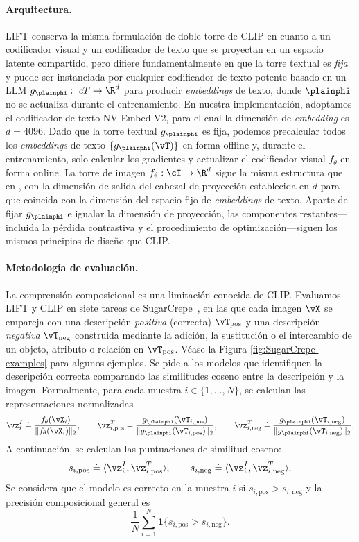 \documentclass[../../book-main_es.tex]{subfiles}
\begin{document}
\paragraph{Arquitectura.}
LIFT conserva la misma formulación de doble torre de CLIP en cuanto a un codificador visual y un 
codificador de texto que se proyectan en un espacio latente compartido, pero difiere 
fundamentalmente en que la torre textual es \emph{fija} y puede ser instanciada por cualquier 
codificador de texto potente basado en un LLM \(g_{\plainphi}:\ cT\to\R^{d}\) para producir 
\textit{embeddings} de texto, donde \(\plainphi\) no se actualiza durante el entrenamiento. En nuestra 
implementación, adoptamos el codificador de texto NV-Embed-V2, para el cual la dimensión de 
\textit{embedding} es \(d=4096\). Dado que la torre textual \(g_{\plainphi}\) es fija, podemos precalcular 
todos los \textit{embeddings} de texto \(\{g_{\plainphi}(\vT)\}\) en forma offline y, durante el 
entrenamiento, solo calcular los gradientes y actualizar el codificador visual 
\(f_{\theta}\) en forma online. La torre de imagen \(f_{\theta}:\cI\to\R^{d}\) sigue la misma 
estructura que en , con la dimensión de salida del cabezal de 
proyección establecida en \(d\) para que coincida con la dimensión del espacio fijo de \textit{embeddings} 
de texto. Aparte de fijar \(g_{\plainphi}\) e igualar la dimensión de proyección, las 
componentes restantes---incluida la pérdida contrastiva y el procedimiento de optimización---siguen 
los mismos principios de diseño que CLIP.

\paragraph{Metodología de evaluación.} 
La comprensión composicional es una limitación conocida de CLIP. Evaluamos LIFT y CLIP en 
siete tareas de SugarCrepe~\citep{hsieh2023sugarcrepe}, en las que cada imagen \(\vX\) se 
empareja con una descripción \emph {positiva} (correcta) \(\vT_{\text{pos}}\) y una descripción \emph{negativa} 
\(\vT_{\text{neg}}\) construida mediante la adición, la sustitución o el intercambio de un objeto, atributo 
o relación en \(\vT_{\text{pos}}\). Véase la Figura \ref{fig:SugarCrepe-examples} para algunos ejemplos.
Se pide a los modelos que identifiquen la descripción correcta comparando las similitudes coseno entre la 
descripción y la imagen. Formalmente, para cada muestra \(i\in\{1,\dots,N\}\), se calculan las representaciones normalizadas
\[
\vz_i^{I} \doteq \frac{f_{\theta}(\vX_i)}{\|f_{\theta}(\vX_i)\|_2},\qquad
\vz_{i,\text{pos}}^{T} \doteq \frac{g_{\plainphi}(\vT_{i,\text{pos}})}{\|g_{\plainphi}(\vT_{i,\text{pos}})\|_2},\qquad
\vz_{i,\text{neg}}^{T} \doteq \frac{g_{\plainphi}(\vT_{i,\text{neg}})}{\|g_{\plainphi}(\vT_{i,\text{neg}})\|_2}.
\]
A continuación, se calculan las puntuaciones de similitud coseno:
\[
s_{i,\text{pos}} \doteq \langle \vz_i^{I}, \vz_{i,\text{pos}}^{T} \rangle,
\qquad
s_{i,\text{neg}} \doteq \langle \vz_i^{I}, \vz_{i,\text{neg}}^{T} \rangle.
\]
Se considera que el modelo es correcto en la muestra \(i\) si
\(s_{i,\text{pos}} > s_{i,\text{neg}}\) y la precisión composicional general es
\[
\frac{1}{N}\sum_{i=1}^{N}\boldsymbol{1}\{s_{i,\text{pos}} > s_{i,\text{neg}}\}.
\]
\end{document}
